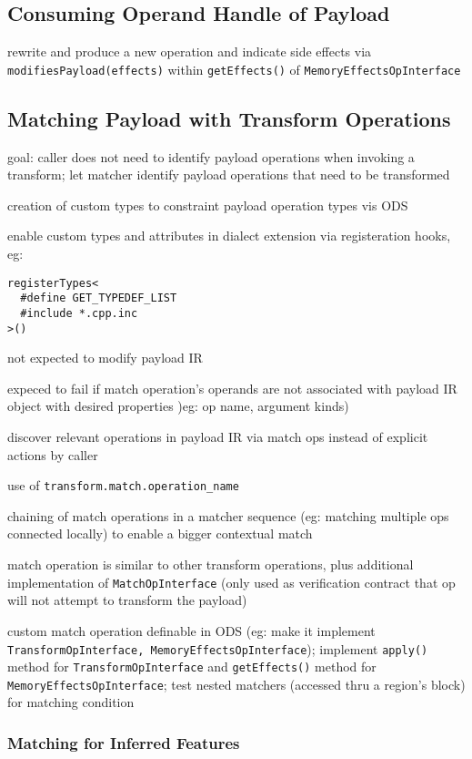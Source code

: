 \documentclass[8pt]{extarticle}
\begin{document}
\begin{multicols*}{2}
\subsection{Consuming Operand Handle of Payload}

rewrite and produce a new operation and indicate side effects via \verb|modifiesPayload(effects)| within \verb|getEffects()| of \verb|MemoryEffectsOpInterface|

\subsection{Matching Payload with Transform Operations}

goal: caller does not need to identify payload operations when invoking a transform; let matcher identify payload operations that need to be transformed

creation of custom types to constraint payload operation types vis ODS

enable custom types and attributes in dialect extension via registeration hooks, eg:
\begin{lstlisting}
registerTypes<
  #define GET_TYPEDEF_LIST
  #include *.cpp.inc
>()
\end{lstlisting}

not expected to modify payload IR

expeced to fail if match operation's operands are not associated with payload IR object with desired properties )eg: op name, argument kinds)

discover relevant operations in payload IR via match ops instead of explicit actions by caller

use of \verb|transform.match.operation_name|

chaining of match operations in a matcher sequence (eg: matching multiple ops connected locally) to enable a bigger contextual match

match operation is similar to other transform operations, plus additional implementation of \verb|MatchOpInterface| (only used as verification contract that op will not attempt to transform the payload)

custom match operation definable in ODS (eg: make it implement \verb|TransformOpInterface, MemoryEffectsOpInterface|); implement \verb|apply()| method for \verb|TransformOpInterface| and \verb|getEffects()| method for \verb|MemoryEffectsOpInterface|; test nested matchers (accessed thru a region's block) for matching condition

\subsubsection{Matching for Inferred Features}


\end{multicols*}
\end{document}
